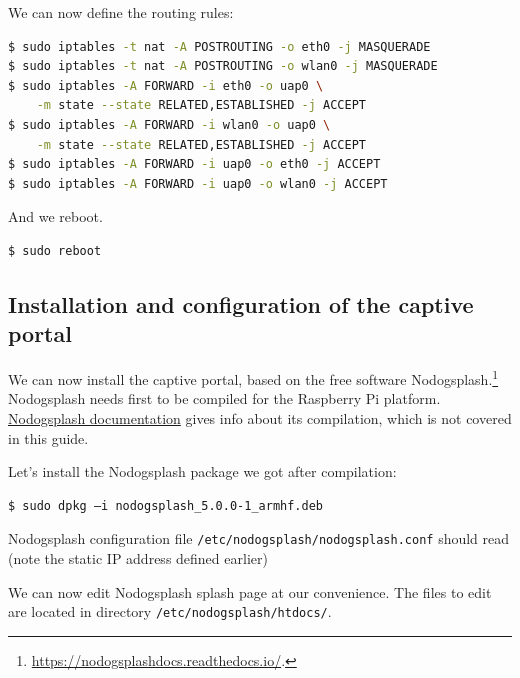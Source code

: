 \documentclass[12pt]{article}
\begin{document}
We can now define the routing rules:
\begin{lstlisting}[language=bash]
$ sudo iptables -t nat -A POSTROUTING -o eth0 -j MASQUERADE
$ sudo iptables -t nat -A POSTROUTING -o wlan0 -j MASQUERADE
$ sudo iptables -A FORWARD -i eth0 -o uap0 \
    -m state --state RELATED,ESTABLISHED -j ACCEPT
$ sudo iptables -A FORWARD -i wlan0 -o uap0 \
    -m state --state RELATED,ESTABLISHED -j ACCEPT
$ sudo iptables -A FORWARD -i uap0 -o eth0 -j ACCEPT
$ sudo iptables -A FORWARD -i uap0 -o wlan0 -j ACCEPT
\end{lstlisting}

And we reboot.
\begin{lstlisting}[language=bash]
$ sudo reboot
\end{lstlisting}

\subsection{Installation and configuration of the captive portal}

We can now install the captive portal, based on the free software Nodogsplash.\footnote{\url{https://nodogsplashdocs.readthedocs.io/}.}
Nodogsplash needs first to be compiled for the Raspberry Pi platform.
\href{https://nodogsplashdocs.readthedocs.io/en/stable/compile.html}{Nodogsplash documentation} gives info about its compilation, which is not covered in this guide.

Let's install the Nodogsplash package we got after compilation:
\begin{lstlisting}[language=bash]
$ sudo dpkg –i nodogsplash_5.0.0-1_armhf.deb
\end{lstlisting}
Nodogsplash configuration file \lstinline{/etc/nodogsplash/nodogsplash.conf} should read (note the static IP address defined earlier)


We can now edit Nodogsplash splash page at our convenience.
The files to edit are located in directory \lstinline{/etc/nodogsplash/htdocs/}.
\end{document}
